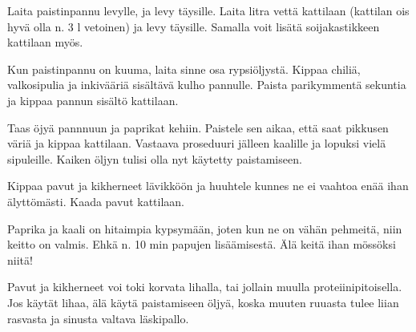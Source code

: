 \begin{recipe}
{        Laita paistinpannu levylle, ja levy täysille. Laita litra vettä kattilaan (kattilan ois hyvä 
        olla n. 3 l vetoinen) ja levy täysille. Samalla voit lisätä soijakastikkeen kattilaan myös.

        Kun paistinpannu on kuuma, laita sinne osa rypsiöljystä. Kippaa chiliä, valkosipulia ja 
        inkivääriä sisältävä kulho pannulle. Paista parikymmentä sekuntia ja kippaa pannun sisältö kattilaan.

        Taas öjyä pannnuun ja paprikat kehiin. Paistele sen aikaa, että saat pikkusen väriä ja kippaa 
        kattilaan. Vastaava proseduuri jälleen kaalille ja lopuksi vielä sipuleille. Kaiken öljyn tulisi 
        olla nyt käytetty paistamiseen. 

        Kippaa pavut ja kikherneet lävikköön ja huuhtele kunnes ne ei vaahtoa enää ihan älyttömästi. 
        Kaada pavut kattilaan. 

        Paprika ja kaali on hitaimpia kypsymään, joten kun ne on vähän pehmeitä, niin keitto on valmis. 
        Ehkä n. 10 min papujen lisäämisestä. Älä keitä ihan mössöksi niitä!

        Pavut ja kikherneet voi toki korvata lihalla, tai jollain muulla proteiinipitoisella. Jos 
        käytät lihaa, älä käytä paistamiseen öljyä, koska muuten ruuasta tulee liian rasvasta ja sinusta 
        valtava läskipallo.
        
        }
    
%    
%    
    
\end{recipe}
